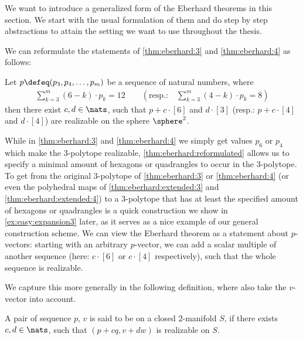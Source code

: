 \label{sec:gen:eberhard}

We want to introduce a generalized form of the {\sc Eberhard} theorems in this section. We start with the usual formulation of them and do step by step abstractions to attain the setting we want to use throughout the thesis.

\clearpage
We can reformulate the statements of \autoref{thm:eberhard:3} and \autoref{thm:eberhard:4} as follows:
\begin{theorem}\label{thm:eberhard:reformulated}
  Let $p \defeq (p_3, p_4, \dots, p_m)$ be a sequence of natural numbers, where
  \begin{align*}
    \sum_{k=3}^m(6 - k) \cdot p_k = 12 \qquad \left( \text{resp.:}\quad \sum_{k=3}^m(4 - k) \cdot p_k = 8 \right)
  \end{align*}
  then there exist $c, d \in \nats$, such that $p + c \cdot [6]$ and $d \cdot [3]$ (resp.: $p + c \cdot [4]$ and $d \cdot [4]$) are realizable on the sphere $\sphere^2$.
\end{theorem}

\begin{remark}\label{rem:gen:is:no:gen}
While in \autoref{thm:eberhard:3} and \autoref{thm:eberhard:4} we simply get values $p_6$ or $p_4$ which make the $3$-polytope realizable, \autoref{thm:eberhard:reformulated} allows us to specify a minimal amount of hexagons or quadrangles to occur in the $3$-polytope. To get from the original $3$-polytope of \autoref{thm:eberhard:3} or \autoref{thm:eberhard:4} (or even the polyhedral maps of \autoref{thm:eberhard:extended:3} and \autoref{thm:eberhard:extended:4}) to a $3$-polytope that has at least the specified amount of hexagons or quadrangles is a quick construction we show in \autoref{ex:easy:expansion3} later, as it serves as a nice example of our general construction scheme. We can view the {\sc Eberhard} theorem as a statement about $p$-vectors: starting with an arbitrary $p$-vector, we can add a scalar multiple of another sequence (here: $c \cdot [6]$ or $c \cdot [4]$ respectively), such that the whole sequence is realizable.
\end{remark}

We capture this more generally in the following definition, where also take the $v$-vector into account.
\begin{definition}[$q$-$w$-realizable]\label{def:eberhard:realizable}
  A pair of sequence $p$, $v$ is said to be  on a closed $2$-manifold $S$, if there exists $c, d \in \nats$, such that $(p + c q, v + d w)$ is realizable on $S$. 
\end{definition}

